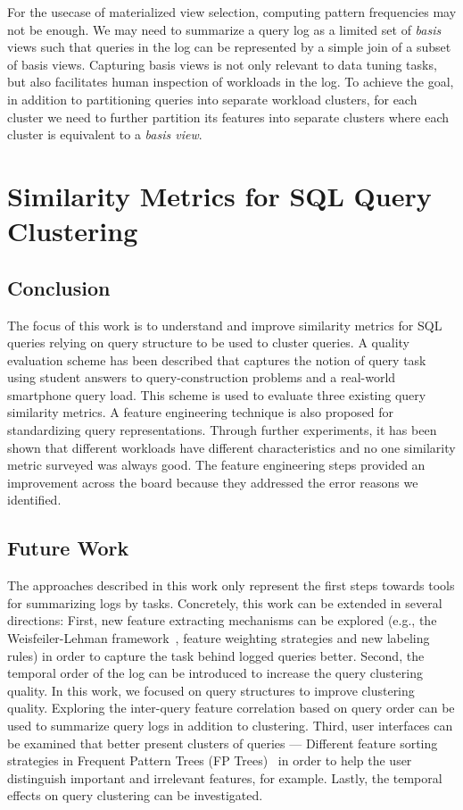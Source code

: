 For the usecase of materialized view selection, computing pattern frequencies may not be enough.
We may need to summarize a query log as a limited set of \textit{basis} views such that queries in the log can be represented by a simple join of a subset of basis views.
Capturing basis views is not only relevant to data tuning tasks, but also facilitates human inspection of workloads in the log.
To achieve the goal, in addition to partitioning queries into separate workload clusters, for each cluster we need to further partition its features into separate clusters where each cluster is equivalent to a \textit{basis view}.

\section{Similarity Metrics for SQL Query Clustering}

\subsection{Conclusion}
The focus of this work is to understand and improve similarity metrics for SQL queries relying on query structure to be used to cluster queries. 
A quality evaluation scheme has been described that captures the notion of query task using student answers to query-construction problems and a real-world smartphone query load.
This scheme is used to evaluate three existing query similarity metrics.
A feature engineering technique is also proposed for standardizing query representations.
Through further experiments, it has been shown that different workloads have different characteristics and no one similarity metric surveyed was always good. 
The feature engineering steps provided an improvement across the board because they addressed the error reasons we identified. 

\subsection{Future Work}
The approaches described in this work only represent the first steps towards tools for summarizing logs by tasks.
Concretely, this work can be extended in several directions:
First, new feature extracting mechanisms can be explored (e.g., the Weisfeiler-Lehman framework~\cite{kul2016ettu}, feature weighting strategies and new labeling rules) in order to capture the task behind logged queries better.
Second, the temporal order of the log can be introduced to increase the query clustering quality. 
In this work, we focused on query structures to improve clustering quality. Exploring the inter-query feature correlation based on query order can be used to summarize query logs in addition to clustering.
Third, user interfaces can be examined that better present clusters of queries --- Different feature sorting strategies in Frequent Pattern Trees (FP Trees)~\cite{han2004mining} in order to help the user distinguish important and irrelevant features, for example.
Lastly, the temporal effects on query clustering can be investigated. 

